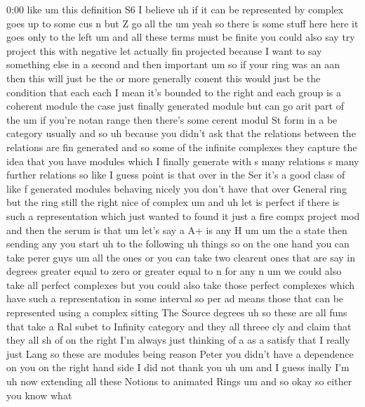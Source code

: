 \begin{unfinished}{0:00}
like  um  this  definition  S6  I
believe
uh  if  it  can  be
represented
by
complex  goes  up  to  some  cus  n
but
Z  go  all
the  um  yeah  so  there  is  some  stuff  here
here  it  goes  only  to  the  left
um  and  all  these  terms  must  be
finite  you  could  also  say  try  project
this  with
negative  let  actually  fin  projected
because  I  want  to  say  something  else  in
a  second  and  then
important
um  so  if  your  ring  was  an  aan  then  this
will  just  be  the  or  more  generally
conent  this  would  just  be  the  condition
that
each  each  I  mean  it's  bounded  to  the
right  and  each  group  is  a  coherent
module  the  case  just  finally  generated
module  but  can  go  arit  part  of
the  um  if  you're  notan  range  then
there's
some  cerent  modul  St  form  in  a  be
category  usually  and  so
uh  because  you  didn't  ask  that  the
relations  between  the  relations  are  fin
generated  and  so  some  of  the  infinite
complexes  they  capture  the  idea  that  you
have
modules  which  I  finally  generate  with  s
many  relations  s  many  further
relations
so
like  I  guess  point  is  that  over  in  the
Ser  it's  a  good  class  of  like  f
generated  modules  behaving  nicely  you
don't  have  that  over  General  ring  but
the  ring  still  the  right  nice  of
complex
um  and  uh  let  is
perfect  if  there  is  such  a
representation  which  just  wanted
to  found  it  just  a  fire  compx  project
mod
and  then  the  serum  is
that  um  let's  say  a
A+  is  any
H
um  um  the  a
state
then  sending
any
you
start  uh  to  the  following  uh  things  so
on  the  one  hand  you  can
take  perer
guys  um  all  the
ones  or  you  can  take  two  clearent  ones
that  are  say  in  degrees  greater  equal  to
zero  or  greater  equal  to  n  for  any
n  um  we  could  also  take  all  perfect
complexes  but  you  could  also  take  those
perfect
complexes  which  have  such  a
representation  in  some
interval  so  per  ad  means  those  that  can
be  represented  using  a  complex  sitting
The  Source
degrees
uh  so  these  are  all  funs  that  take  a  Ral
subet  to  Infinity  category
and  they  all  threee  cly  and  claim  that
they  all  sh
of  on  the  right  I'm  always  just  thinking
of  a  as
a  satisfy  that  I  really  just
Lang  so  these  are
modules
being
reason  Peter  you  didn't  have  a
dependence  on  you  on  the  right  hand  side
I  did  not  thank  you
uh  um  and  I  guess  inally  I'm  uh  now
extending  all  these  Notions  to  animated
Rings
um  and  so  okay  so  either  you  know  what

\end{unfinished}
